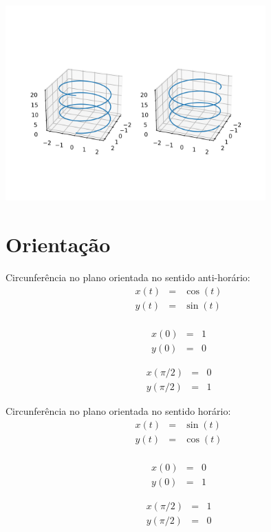 \documentclass[a4paper,10pt]{article}
\begin{document}
\begin{center}
 \includegraphics[width=10cm]{figs/duas_helices.png}
 \end{center}

 \section{Orientação}
 
 Circunferência no plano orientada no sentido anti-horário:
 \begin{eqnarray*}
  x(t) &=& \cos(t)\\
  y(t) &=& \sin(t)\\
 \end{eqnarray*}
 
\begin{eqnarray*}
  x(0) &=& 1\\
  y(0) &=& 0
 \end{eqnarray*}

 \begin{eqnarray*}
  x(\pi/2) &=& 0\\
  y(\pi/2) &=& 1
 \end{eqnarray*}
 
 
 
 Circunferência no plano orientada no sentido horário:
 \begin{eqnarray*}
  x(t) &=& \sin(t)\\
  y(t) &=& \cos(t)\\
 \end{eqnarray*}
 
\begin{eqnarray*}
  x(0) &=& 0\\
  y(0) &=& 1
 \end{eqnarray*}

 \begin{eqnarray*}
  x(\pi/2) &=& 1\\
  y(\pi/2) &=& 0
 \end{eqnarray*}
 
\end{document}
